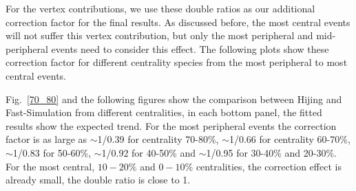 \begin{figure}
\end{figure}

For the vertex contributions, we use these double ratios as our additional correction factor for the final results. As discussed before, the most central events will not suffer this vertex contribution, but only the most peripheral and mid-peripheral events need to consider this effect. The following plots show these correction factor for different centrality species from the most peripheral to most central events.


Fig.~\ref{70_80} and the following figures show the comparison between Hijing and Fast-Simulation from different centralities, in each bottom panel, the fitted results show the expected trend. For the most peripheral events the correction factor is as large as $\sim$1/0.39 for centrality 70-80\%, $\sim$1/0.66 for centrality 60-70\%, $\sim$1/0.83 for 50-60\%, $\sim$1/0.92 for 40-50\% and $\sim$1/0.95 for 30-40\% and 20-30\%. For the most central, $10-20\%$ and $0-10\%$ centralities, the correction effect is already small, the double ratio is close to 1. $ $


